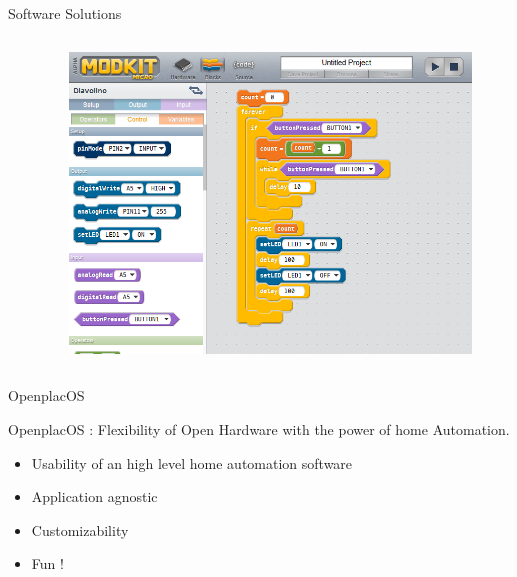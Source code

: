 \documentclass{beamer}
\begin{document}
\begin{frame}{Software Solutions}
\begin{columns}
\begin{column}[l]{0.5\textwidth}
\begin{itemize}
\end{itemize}
\end{column}
\begin{column}[r]{0.5\textwidth}
\begin{figure}
\includegraphics[width=0.9\columnwidth]{figures/modkit.png}
\end{figure}
\end{column}
\end{columns}
\end{frame}

\begin{frame}{OpenplacOS}
\begin{block}{OpenplacOS : }
Flexibility of Open Hardware with the power of home Automation.
\begin{itemize}
\item[\Large\smiley] Usability of an high level home automation software
\item[\Large\smiley] Application agnostic 
\item[\Large\smiley] Customizability
\item[\Large\smiley] Fun !
\end{itemize}
\end{block}
\end{frame}
\end{document}
